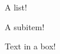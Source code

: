 \Huge %
\begin{center}
    {\myfont  {}}
\end{center}
  
\Large


\begin{myitems}
A list!
    \begin{myitems}
        A subitem!
    \end{myitems}
\end{myitems}

\begin{mybox}
\begin{center}
    Text in a box!
\end{center}
\end{mybox}
